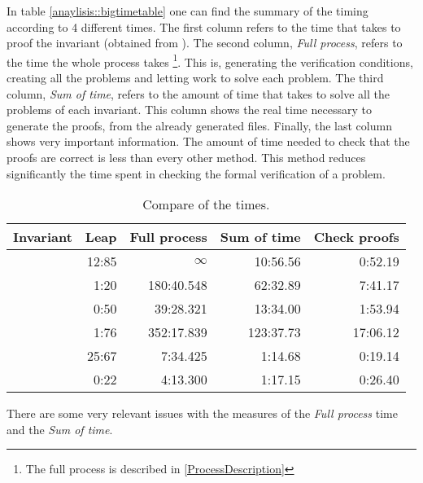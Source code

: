 In table \ref{anaylisis::bigtimetable} one can find the summary of the timing according to 4 different times. The first column refers to the time that \leap takes to proof the invariant (obtained from \cite{paperParametrizedInvariants}). 
%
The second column, \textit{Full process}, refers to the time the whole process takes \footnote{The full process is described in \ref{ProcessDescription}}. 
%
This is, generating the verification conditions, creating all the \spass problems and letting \spass work to solve each problem.
%
The third column, \textit{Sum of \spass time}, refers to the amount of time that \spass takes to solve all the problems of each invariant.
%
This column shows the real time necessary to generate the proofs, from the already generated files.
%
Finally, the last column shows very important information.
%
The amount of time needed to check that the proofs are correct is less than every other method. 
%
This method reduces significantly the time spent in checking the formal verification of a problem.


\begin{table}[hbtp]
\centering
\begin{tabular}{r|rrrr}
Invariant 		& Leap 	& Full process 		& Sum of \spass time 	& Check proofs 	\\\hline
\invPreserve 	& 12:85	& $\infty$			& 10:56.56				& 0:52.19		\\
\invOrder		& 1:20	& 180:40.548		& 62:32.89				& 7:41.17 		\\
\invLock		& 0:50	& 39:28.321			& 13:34.00 				& 1:53.94		\\
\invNext 		& 1:76	& 352:17.839		& 123:37.73				& 17:06.12		\\
\invRegion		& 25:67	& 7:34.425			& 1:14.68				& 0:19.14		\\
\invDisjoint 	& 0:22 	& 4:13.300 			& 1:17.15 				& 0:26.40		\\
\end{tabular}
\caption{Compare of the times.}
\label{anaylsis:bigtimetable}
\end{table}


There are some very relevant issues with the measures of the \textit{Full process} time and the \textit{Sum of \spass time}.

